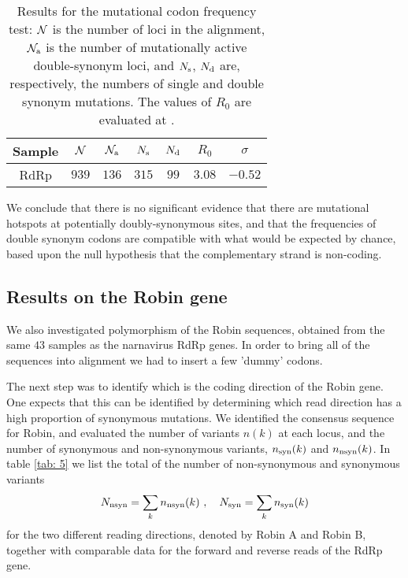 \documentclass[9pt,lineno]{elife}
\newcommand{\MW}[1]{{\color{magenta}{#1}}}
\begin{document}
\begin{table}
\centering
\begin{tabular}{|c|c|c|c|c|c|c|}
\hline
Sample&${\cal N}$&${\cal N}_{\rm a}$&$N_{\rm s}$&$N_{\rm d}$&$R_0$&$\sigma$\\ 
\hline
RdRp  &$939$&$136$&$315$&$99$&$3.08$&$-0.52$\\ 
\hline
\end{tabular}
\caption{Results for the mutational codon frequency test: ${\cal N}$ is the number of loci
in the alignment, ${\cal N}_{\rm a}$ is the number of mutationally active double-synonym loci, and 
$N_{\rm s}$, $N_{\rm d}$ are, respectively, the numbers of single and double synonym mutations. 
The values of $R_0$ are evaluated at \MW{$\alpha=3.13$}.
\label{tab: 4}}
\end{table}

We conclude that there is no significant evidence that there are mutational hotspots at potentially 
doubly-synonymous sites, and that the frequencies of double synonym codons are compatible 
with what would be expected by chance, based upon the null hypothesis that the complementary 
strand is non-coding. 

\subsection{Results on the Robin gene}
\label{sec: 4.2}

We also investigated polymorphism of the Robin sequences, obtained from the same $43$ 
samples as the narnavirus RdRp genes. In order to bring all of the sequences into alignment 
we had to insert a few 'dummy' codons. \MW{We inserted two dummy codons at 
nucleotide locus $408$ into $25$ of the sequences,  and another dummy codon at nucleotide 
locus $560$ into $37$ sequences. For each nucleotide locus, we determined a consensus nucleotide, 
and determined the set of variants that were seen at each site. 
We found a total of $218$ transitions and $156$ transversions across the $860$
nucleotide loci, indicating a mutation rate ratio $\alpha=2.79$, and a rate of selected mutations equal to 
$0.0101$ mutations per nucleotide per polymorph.}

The next step was to identify which is the coding direction of the Robin gene. 
One expects that this can be identified by determining which read direction has 
a high proportion of synonymous mutations. We identified the consensus sequence 
for Robin, and evaluated the number of variants $n(k)$ at each locus, and the number 
of synonymous and non-synonymous variants, $n_{\rm syn}(k)$ and $n_{\rm nsyn}(k)$. 
In table \ref{tab: 5} we list the total of the number of non-synonymous 
and synonymous variants
%
\begin{equation}
\label{eq: 4.1}
N_{\rm nsyn}=\sum_k n_{\rm nsyn}(k)
\ ,\ \ \
N_{\rm syn}=\sum_k n_{\rm syn}(k)
\end{equation}
%
for the two different reading directions, denoted by Robin A and Robin B, together with comparable data 
for the forward and reverse reads of the RdRp gene.
\end{document}
